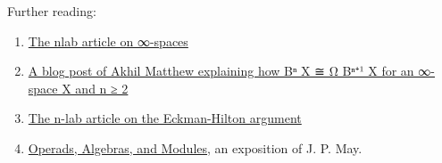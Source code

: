 \documentclass{book}
\theoremstyle{definition}
\begin{document}
Further reading:

\begin{enumerate}
\item \href{https://ncatlab.org/nlab/show/Gamma-space}{The nlab article on ∞-spaces}
\item \href{https://amathew.wordpress.com/2012/09/16/segals-infinite-loop-space-machine/}{A blog post of Akhil Matthew explaining how Bⁿ X ≅ Ω Bⁿ⁺¹ X for an ∞-space X and n ≥ 2}
\item \href{https://ncatlab.org/nlab/show/Eckmann-Hilton+argument#:~:text=In%20its%20original%20form%2C%20the,or%20Groups%20is%20necessarily%20commutative.}{The n-lab article on the Eckman-Hilton argument}
\item \href{http://www.math.uchicago.edu/~may/PAPERS/mayi.pdf}{Operads, Algebras, and Modules}, an exposition of J. P. May.
\end{enumerate}


\newpage
\ \\
\thispagestyle{empty}
\end{document}
